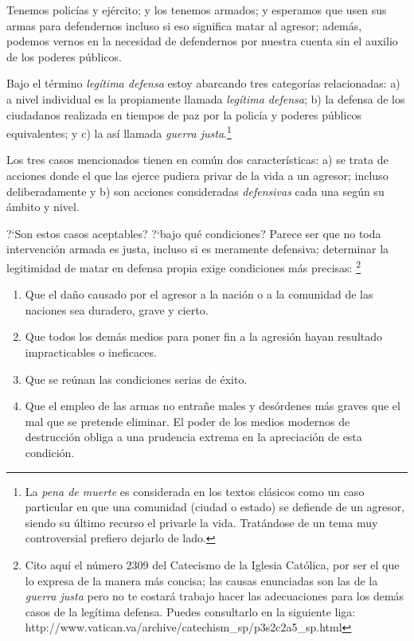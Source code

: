 \documentclass{article}
\begin{document}
Tenemos polic\'{i}as y ej\'ercito; y los tenemos armados; y esperamos que usen sus armas para defendernos incluso si eso significa matar al agresor; adem\'as, podemos vernos en la necesidad de defendernos por nuestra cuenta sin el auxilio de los poderes p\'ublicos.

Bajo el t\'ermino \emph{leg\'{i}tima defensa} estoy abarcando tres categor\'{i}as relacionadas: a) a nivel individual es la propiamente llamada \emph{leg\'{i}tima defensa}; b) la defensa de los ciudadanos realizada en tiempos de paz por la polic\'{i}a y poderes p\'ublicos equivalentes; y c) la as\'{i} llamada \emph{guerra justa}.\footnote{La \emph{pena de muerte} es considerada en los textos cl\'asicos como un caso particular en que una comunidad (ciudad o estado) se defiende de un agresor, siendo su \'ultimo recurso el privarle la vida. Trat\'andose de un tema muy controversial prefiero dejarlo de lado.}

Los tres casos mencionados tienen en com\'un dos caracter\'{i}sticas: a) se trata de acciones donde el que las ejerce pudiera privar de la vida a un agresor; incluso deliberadamente y b) son acciones consideradas \emph{defensivas} cada una seg\'un su \'ambito y nivel.

?`Son estos casos aceptables? ?`bajo qu\'e condiciones? Parece ser que no toda intervenci\'on armada es justa, incluso si es meramente defensiva; determinar la legitimidad de matar en defensa propia exige condiciones m\'as precisas:%
    \footnote{Cito aqu\'{i} el n\'umero 2309 del Catecismo de la Iglesia Cat\'olica, por ser el que lo expresa de la manera m\'as concisa; las causas enunciadas son las de la \emph{guerra justa} pero no te costar\'a trabajo hacer las adecuaciones para los dem\'as casos de la leg\'{i}tima defensa. Puedes consultarlo en la siguiente liga: http://www.vatican.va/archive/catechism\_sp/p3s2c2a5\_sp.html}

\begin{enumerate}
\item Que el daño causado por el agresor a la nación o a la comunidad de las naciones sea duradero, grave y cierto.
\item Que todos los demás medios para poner fin a la agresión hayan resultado impracticables o ineficaces.
\item Que se reúnan las condiciones serias de éxito.
\item Que el empleo de las armas no entrañe males y desórdenes más graves que el mal que se pretende eliminar. El poder de los medios modernos de destrucción obliga a una prudencia extrema en la apreciación de esta condición.
\end{enumerate}
\end{document}
